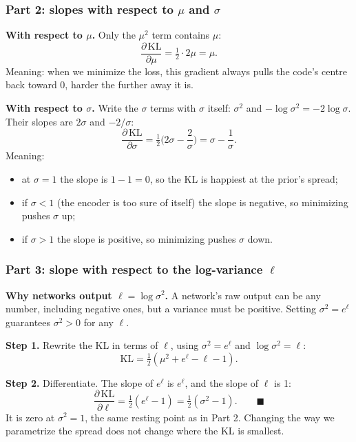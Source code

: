 \documentclass[12pt,a4paper]{article}
\begin{document}
\subsubsection{Part 2: slopes with respect to $\mu$ and $\sigma$}

\textbf{With respect to $\mu$.} Only the $\mu^2$ term contains $\mu$:
\[
\frac{\partial\, \mathrm{KL}}{\partial \mu} = \tfrac{1}{2}\cdot 2\mu = \mu.
\]
Meaning: when we minimize the loss, this gradient always pulls the code's centre back toward 0, harder the further away it is.

\textbf{With respect to $\sigma$.} Write the $\sigma$ terms with $\sigma$ itself: $\sigma^2$ and $-\log\sigma^2 = -2\log\sigma$. Their slopes are $2\sigma$ and $-2/\sigma$:
\[
\frac{\partial\, \mathrm{KL}}{\partial \sigma} = \tfrac{1}{2}\Big(2\sigma - \frac{2}{\sigma}\Big) = \sigma - \frac{1}{\sigma}.
\]
Meaning:
\begin{itemize}[leftmargin=*]
\item at $\sigma = 1$ the slope is $1 - 1 = 0$, so the KL is happiest at the prior's spread;
\item if $\sigma < 1$ (the encoder is too sure of itself) the slope is negative, so minimizing pushes $\sigma$ up;
\item if $\sigma > 1$ the slope is positive, so minimizing pushes $\sigma$ down.
\end{itemize}

\subsubsection{Part 3: slope with respect to the log-variance $\ell$}

\textbf{Why networks output $\ell = \log \sigma^2$.} A network's raw output can be any number, including negative ones, but a variance must be positive. Setting $\sigma^2 = e^{\ell}$ guarantees $\sigma^2 > 0$ for any $\ell$.

\textbf{Step 1.} Rewrite the KL in terms of $\ell$, using $\sigma^2 = e^\ell$ and $\log\sigma^2 = \ell$:
\[
\mathrm{KL} = \tfrac{1}{2}\left(\mu^2 + e^{\ell} - \ell - 1\right).
\]

\textbf{Step 2.} Differentiate. The slope of $e^\ell$ is $e^\ell$, and the slope of $\ell$ is 1:
\[
\frac{\partial\, \mathrm{KL}}{\partial \ell} = \tfrac{1}{2}\left(e^{\ell} - 1\right) = \tfrac{1}{2}\left(\sigma^2 - 1\right). \qquad \blacksquare
\]
It is zero at $\sigma^2 = 1$, the same resting point as in Part 2. Changing the way we parametrize the spread does not change where the KL is smallest.
\end{document}
